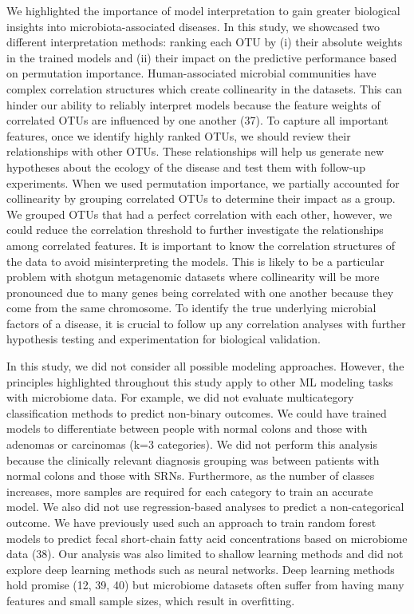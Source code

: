 \documentclass[11pt,]{article}
\begin{document}
We highlighted the importance of model interpretation to gain greater
biological insights into microbiota-associated diseases. In this study,
we showcased two different interpretation methods: ranking each OTU by
(i) their absolute weights in the trained models and (ii) their impact
on the predictive performance based on permutation importance.
Human-associated microbial communities have complex correlation
structures which create collinearity in the datasets. This can hinder
our ability to reliably interpret models because the feature weights of
correlated OTUs are influenced by one another (37). To capture all
important features, once we identify highly ranked OTUs, we should
review their relationships with other OTUs. These relationships will
help us generate new hypotheses about the ecology of the disease and
test them with follow-up experiments. When we used permutation
importance, we partially accounted for collinearity by grouping
correlated OTUs to determine their impact as a group. We grouped OTUs
that had a perfect correlation with each other, however, we could reduce
the correlation threshold to further investigate the relationships among
correlated features. It is important to know the correlation structures
of the data to avoid misinterpreting the models. This is likely to be a
particular problem with shotgun metagenomic datasets where collinearity
will be more pronounced due to many genes being correlated with one
another because they come from the same chromosome. To identify the true
underlying microbial factors of a disease, it is crucial to follow up
any correlation analyses with further hypothesis testing and
experimentation for biological validation.

In this study, we did not consider all possible modeling approaches.
However, the principles highlighted throughout this study apply to other
ML modeling tasks with microbiome data. For example, we did not evaluate
multicategory classification methods to predict non-binary outcomes. We
could have trained models to differentiate between people with normal
colons and those with adenomas or carcinomas (k=3 categories). We did
not perform this analysis because the clinically relevant diagnosis
grouping was between patients with normal colons and those with SRNs.
Furthermore, as the number of classes increases, more samples are
required for each category to train an accurate model. We also did not
use regression-based analyses to predict a non-categorical outcome. We
have previously used such an approach to train random forest models to
predict fecal short-chain fatty acid concentrations based on microbiome
data (38). Our analysis was also limited to shallow learning methods and
did not explore deep learning methods such as neural networks. Deep
learning methods hold promise (12, 39, 40) but microbiome datasets often
suffer from having many features and small sample sizes, which result in
overfitting.
\end{document}
